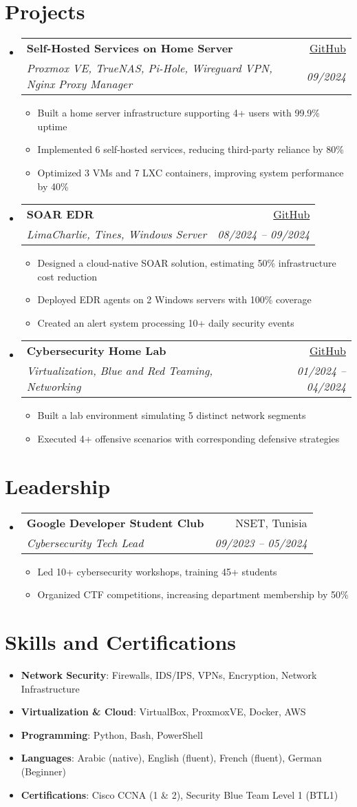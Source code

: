 \documentclass[a4paper,10pt]{article}
\makeatletter
\newcommand{\resumeItem}[1]{
  \item\small{#1}
}
\newcommand{\resumeSubheading}[4]{
  \vspace{-2pt}\item
    \begin{tabular*}{0.97\textwidth}[t]{l@{\extracolsep{\fill}}r}
      \textbf{#1} & #2 \\
      \textit{#3} & \textit{#4} \\
    \end{tabular*}\vspace{-7pt}
}
\newcommand{\resumeSubHeadingListStart}{\begin{itemize}[leftmargin=*,label={}]}
\newcommand{\resumeSubHeadingListEnd}{\end{itemize}}
\newcommand{\resumeItemListStart}{\begin{itemize}}
\newcommand{\resumeItemListEnd}{\end{itemize}\vspace{-5pt}}
\makeatother
\begin{document}
\section{Projects}
\resumeSubHeadingListStart
  \resumeSubheading
    {Self-Hosted Services on Home Server}{\href{https://github.com/nattycoder/self-host}{GitHub}}
    {Proxmox VE, TrueNAS, Pi-Hole, Wireguard VPN, Nginx Proxy Manager}{09/2024}
    \resumeItemListStart
        \resumeItem{Built a home server infrastructure supporting 4+ users with 99.9\% uptime}
        \resumeItem{Implemented 6 self-hosted services, reducing third-party reliance by 80\%}
        \resumeItem{Optimized 3 VMs and 7 LXC containers, improving system performance by 40\%}
    \resumeItemListEnd
  \resumeSubheading
    {SOAR EDR}{\href{https://github.com/nattycoder/soar-edr}{GitHub}}
    {LimaCharlie, Tines, Windows Server}{08/2024 -- 09/2024}
    \resumeItemListStart
        \resumeItem{Designed a cloud-native SOAR solution, estimating 50\% infrastructure cost reduction}
        \resumeItem{Deployed EDR agents on 2 Windows servers with 100\% coverage}
        \resumeItem{Created an alert system processing 10+ daily security events}
    \resumeItemListEnd
  \resumeSubheading
    {Cybersecurity Home Lab}{\href{https://github.com/nattycoder/cybersecurity-homelab}{GitHub}}
    {Virtualization, Blue and Red Teaming, Networking}{01/2024 -- 04/2024}
    \resumeItemListStart
        \resumeItem{Built a lab environment simulating 5 distinct network segments}
        \resumeItem{Executed 4+ offensive scenarios with corresponding defensive strategies}
    \resumeItemListEnd
\resumeSubHeadingListEnd

\section{Leadership}
\resumeSubHeadingListStart
  \resumeSubheading
    {Google Developer Student Club}{NSET, Tunisia}
    {Cybersecurity Tech Lead}{09/2023 -- 05/2024}
    \resumeItemListStart
        \resumeItem{Led 10+ cybersecurity workshops, training 45+ students}
        \resumeItem{Organized CTF competitions, increasing department membership by 50\%}
    \resumeItemListEnd
\resumeSubHeadingListEnd

\section{Skills and Certifications}
\begin{itemize}[leftmargin=*]
    \item \textbf{Network Security}: Firewalls, IDS/IPS, VPNs, Encryption, Network Infrastructure 
    \item \textbf{Virtualization \& Cloud}: VirtualBox, ProxmoxVE, Docker, AWS
    \item \textbf{Programming}: Python, Bash, PowerShell
    \item \textbf{Languages}: Arabic (native), English (fluent), French (fluent), German (Beginner)
    \item \textbf{Certifications}: Cisco CCNA (1 \& 2), Security Blue Team Level 1 (BTL1)
\end{itemize}
\end{document}
